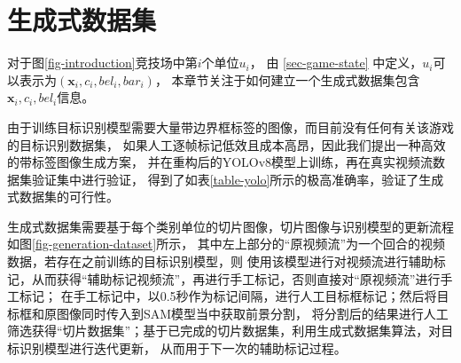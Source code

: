 \documentclass[openany,twoside,nofonts,AutoFakeBold,UTF8]{ctexbook}
\def\bd{\boldsymbol}        %
\begin{document}
\section{生成式数据集}\label{sec-generation-dataset}
对于图\ref{fig-introduction}竞技场中第$i$个单位$u_i$，
由 \ref{sec-game-state} 中定义，$u_i$可以表示为$(\bd{x}_i, c_i, bel_i,bar_i)$，
本章节关注于如何建立一个生成式数据集包含$\bd{x}_i,c_i,bel_i$信息。

由于训练目标识别模型需要大量带边界框标签的图像，而目前没有任何有关该游戏的目标识别数据集，
如果人工逐帧标记低效且成本高昂，因此我们提出一种高效的带标签图像生成方案，
并在重构后的YOLOv8模型上训练，再在真实视频流数据集验证集中进行验证，
得到了如表\ref{table-yolo}所示的极高准确率，验证了生成式数据集的可行性。

生成式数据集需要基于每个类别单位的切片图像，切片图像与识别模型的更新流程如图\ref{fig-generation-dataset}所示，
其中左上部分的“原视频流”为一个回合的视频数据，若存在之前训练的目标识别模型，则
使用该模型进行对视频流进行辅助标记，从而获得“辅助标记视频流”，再进行手工标记，否则直接对“原视频流”进行手工标记；
在手工标记中，以0.5秒作为标记间隔，进行人工目标框标记；然后将目标框和原图像同时传入到SAM模型当中获取前景分割，
将分割后的结果进行人工筛选获得“切片数据集”；基于已完成的切片数据集，利用生成式数据集算法，对目标识别模型进行迭代更新，
从而用于下一次的辅助标记过程。
\end{document}
